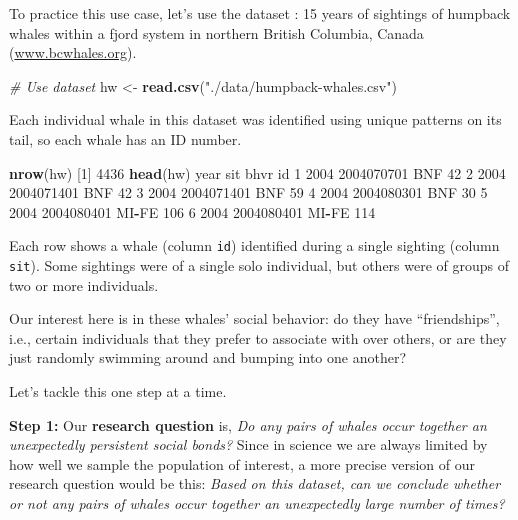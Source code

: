 \documentclass[
]{book}
\newenvironment{Shaded}{\begin{snugshade}}{\end{snugshade}}
\newcommand{\CommentTok}[1]{\textcolor[rgb]{0.56,0.35,0.01}{\textit{#1}}}
\newcommand{\DecValTok}[1]{\textcolor[rgb]{0.00,0.00,0.81}{#1}}
\newcommand{\KeywordTok}[1]{\textcolor[rgb]{0.13,0.29,0.53}{\textbf{#1}}}
\newcommand{\NormalTok}[1]{#1}
\newcommand{\OperatorTok}[1]{\textcolor[rgb]{0.81,0.36,0.00}{\textbf{#1}}}
\newcommand{\StringTok}[1]{\textcolor[rgb]{0.31,0.60,0.02}{#1}}
\begin{document}
To practice this use case, let's use the dataset : 15 years of sightings of humpback whales within a fjord system in northern British Columbia, Canada (\url{www.bcwhales.org}).

\begin{Shaded}
\begin{Highlighting}[]
\CommentTok{# Use dataset}
\NormalTok{hw <-}\StringTok{ }\KeywordTok{read.csv}\NormalTok{(}\StringTok{"./data/humpback-whales.csv"}\NormalTok{)}
\end{Highlighting}
\end{Shaded}

Each individual whale in this dataset was identified using unique patterns on its tail, so each whale has an ID number.

\begin{Shaded}
\begin{Highlighting}[]
\KeywordTok{nrow}\NormalTok{(hw)}
\NormalTok{[}\DecValTok{1}\NormalTok{] }\DecValTok{4436}
\KeywordTok{head}\NormalTok{(hw)}
\NormalTok{  year        sit  bhvr  id}
\DecValTok{1} \DecValTok{2004} \DecValTok{2004070701}\NormalTok{   BNF  }\DecValTok{42}
\DecValTok{2} \DecValTok{2004} \DecValTok{2004071401}\NormalTok{   BNF  }\DecValTok{42}
\DecValTok{3} \DecValTok{2004} \DecValTok{2004071401}\NormalTok{   BNF  }\DecValTok{59}
\DecValTok{4} \DecValTok{2004} \DecValTok{2004080301}\NormalTok{   BNF  }\DecValTok{30}
\DecValTok{5} \DecValTok{2004} \DecValTok{2004080401}\NormalTok{ MI}\OperatorTok{-}\NormalTok{FE }\DecValTok{106}
\DecValTok{6} \DecValTok{2004} \DecValTok{2004080401}\NormalTok{ MI}\OperatorTok{-}\NormalTok{FE }\DecValTok{114}
\end{Highlighting}
\end{Shaded}

Each row shows a whale (column \texttt{id}) identified during a single sighting (column \texttt{sit}). Some sightings were of a single solo individual, but others were of groups of two or more individuals.

Our interest here is in these whales' social behavior: do they have ``friendships'', i.e., certain individuals that they prefer to associate with over others, or are they just randomly swimming around and bumping into one another?

Let's tackle this one step at a time.

\textbf{Step 1:} Our \textbf{research question} is, \emph{Do any pairs of whales occur together an unexpectedly persistent social bonds?} Since in science we are always limited by how well we sample the population of interest, a more precise version of our research question would be this: \emph{Based on this dataset, can we conclude whether or not any pairs of whales occur together an unexpectedly large number of times?}
\end{document}
